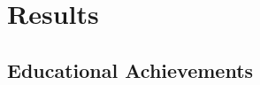 \section{Results}\label{sec:results}
\subsection{Educational Achievements}\label{subsec:educational-achievements}